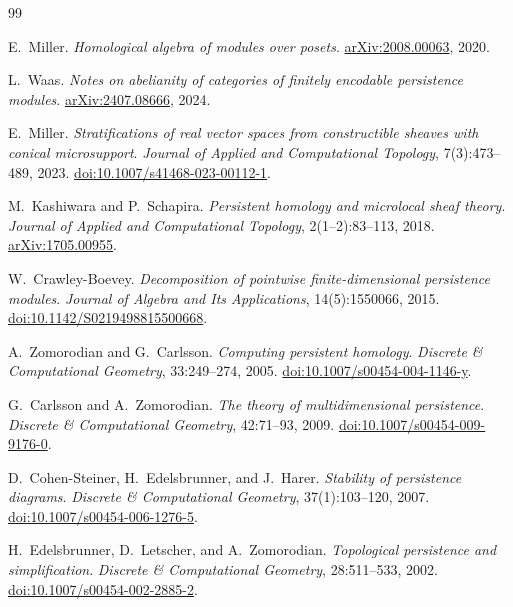 \documentclass[11pt]{article}
\begin{document}
\begin{thebibliography}{99}

E.~Miller.
\newblock \emph{Homological algebra of modules over posets}.
\newblock \href{https://arxiv.org/abs/2008.00063}{arXiv:2008.00063}, 2020.

L.~Waas.
\newblock \emph{Notes on abelianity of categories of finitely encodable persistence modules}.
\newblock \href{https://arxiv.org/abs/2407.08666}{arXiv:2407.08666}, 2024.

E.~Miller.
\newblock \emph{Stratifications of real vector spaces from constructible sheaves with conical microsupport}.
\newblock \emph{Journal of Applied and Computational Topology}, 7(3):473--489, 2023.
\newblock \href{https://doi.org/10.1007/s41468-023-00112-1}{doi:10.1007/s41468-023-00112-1}.

M.~Kashiwara and P.~Schapira.
\newblock \emph{Persistent homology and microlocal sheaf theory}.
\newblock \emph{Journal of Applied and Computational Topology}, 2(1--2):83--113, 2018.
\newblock \href{https://arxiv.org/abs/1705.00955}{arXiv:1705.00955}.

W.~Crawley-Boevey.
\newblock \emph{Decomposition of pointwise finite-dimensional persistence modules}.
\newblock \emph{Journal of Algebra and Its Applications}, 14(5):1550066, 2015.
\newblock \href{https://doi.org/10.1142/S0219498815500668}{doi:10.1142/S0219498815500668}.

A.~Zomorodian and G.~Carlsson.
\newblock \emph{Computing persistent homology}.
\newblock \emph{Discrete \& Computational Geometry}, 33:249--274, 2005.
\newblock \href{https://doi.org/10.1007/s00454-004-1146-y}{doi:10.1007/s00454-004-1146-y}.

G.~Carlsson and A.~Zomorodian.
\newblock \emph{The theory of multidimensional persistence}.
\newblock \emph{Discrete \& Computational Geometry}, 42:71--93, 2009.
\newblock \href{https://doi.org/10.1007/s00454-009-9176-0}{doi:10.1007/s00454-009-9176-0}.

D.~Cohen-Steiner, H.~Edelsbrunner, and J.~Harer.
\newblock \emph{Stability of persistence diagrams}.
\newblock \emph{Discrete \& Computational Geometry}, 37(1):103--120, 2007.
\newblock \href{https://doi.org/10.1007/s00454-006-1276-5}{doi:10.1007/s00454-006-1276-5}.

H.~Edelsbrunner, D.~Letscher, and A.~Zomorodian.
\newblock \emph{Topological persistence and simplification}.
\newblock \emph{Discrete \& Computational Geometry}, 28:511--533, 2002.
\newblock \href{https://doi.org/10.1007/s00454-002-2885-2}{doi:10.1007/s00454-002-2885-2}.


\end{thebibliography}
\end{document}
